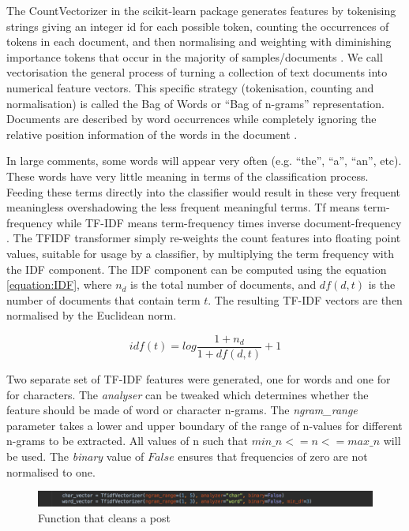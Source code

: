 The CountVectorizer in the scikit-learn package generates features by tokenising strings giving an integer id for each possible token, counting the occurrences of tokens in each document, and then normalising and weighting with diminishing importance tokens that occur in the majority of samples/documents \cite{scikit:tfidf}. We call vectorisation the general process of turning a collection of text documents into numerical feature vectors. This specific strategy (tokenisation, counting and normalisation) is called the Bag of Words or ``Bag of n-grams'' representation. Documents are described by word occurrences while completely ignoring the relative position information of the words in the document \cite{scikit:tfidf}.

In large comments, some words will appear very often (e.g. ``the'', ``a'', ``an'', etc). These words have very little meaning in terms of the classification process. Feeding these terms directly into the classifier would result in these very frequent meaningless overshadowing the less frequent meaningful terms. Tf means term-frequency while TF-IDF means term-frequency times inverse document-frequency \cite{scikit:tfidf}. The TFIDF transformer simply re-weights the count features into floating point values, suitable for usage by a classifier, by multiplying the term frequency with the IDF component. The IDF component can be computed using the equation \ref{equation:IDF}, where $n_{d}$ is the total number of documents, and $df(d,t)$ is the number of documents that contain term $t$. The resulting TF-IDF vectors are then normalised by the Euclidean norm.

\begin{equation}
	idf(t) = log\frac{1 + n_{d}}{1 + df(d, t)} + 1
	\label{equation:IDF}
\end{equation}

Two separate set of TF-IDF features were generated, one for words and one for for characters. The \textit{analyser} can be tweaked which determines whether the feature should be made of word or character n-grams. The \textit{ngram\_range} parameter takes a lower and upper boundary of the range of n-values for different n-grams to be extracted. All values of n such that $min\_n <= n <= max\_n$ will be used. The \textit{binary} value of $False$ ensures that frequencies of zero are not normalised to one.

\begin{figure}[H]
	\centering
	\includegraphics[width=\textwidth]{Images/Implementation/DataProcessing/AbuseDetection/TFIDF}
	\caption{Function that cleans a post}
	\label{fig:AbuseDetection-TFIDF}
\end{figure}

